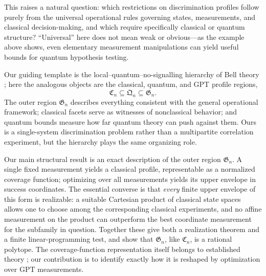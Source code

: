 \documentclass[a4paper,11pt,onecolumn,unpublished]{quantumarticle}
\theoremstyle{definition}
\newcommand{\1}{\mathbf 1}
\newcommand{\Creg}{\mathfrak C}
\newcommand{\Qreg}{\mathfrak Q}
\newcommand{\Greg}{\mathfrak G}
\begin{document}
This raises a natural question: which restrictions on discrimination profiles
follow purely from the universal operational rules governing states,
measurements, and classical decision-making, and which require specifically
classical or quantum structure? ``Universal'' here does not mean weak or
obvious---as the example above shows, even elementary measurement manipulations
can yield useful bounds for quantum hypothesis testing.

Our guiding template is the local--quantum--no-signalling hierarchy of Bell
theory \cite{BrunnerEtAl2014}; here the analogous objects are the classical,
quantum, and GPT profile regions,
\begin{equation}\label{eq:hierarchy}
 \Creg_n\subseteq\Qreg_n\subseteq\Greg_n.
\end{equation}
The outer region $\Greg_n$ describes everything consistent with the general
operational framework; classical facets serve as witnesses of nonclassical
behavior; and quantum bounds measure how far quantum theory can push against
them. Ours is a single-system discrimination problem rather than a multipartite
correlation experiment, but the hierarchy plays the same organizing role.

Our main structural result is an exact description of the outer region
$\Greg_n$. A single fixed measurement yields a classical profile,
representable as a normalized coverage function; optimizing over all
measurements yields its upper envelope in success coordinates. The essential
converse is that \emph{every} finite upper envelope of this form is realizable:
a suitable Cartesian product of classical state spaces allows one to choose
among the corresponding classical experiments, and no affine measurement on
the product can outperform the best coordinate measurement for the subfamily
in question. Together these give both a realization theorem and a finite
linear-programming test, and show that $\Greg_n$, like $\Creg_n$, is a rational
polytope. The coverage-function representation itself belongs to established
theory \cite{StrokorbSchlather2015}; our contribution is to identify exactly how
it is reshaped by optimization over GPT measurements.
\end{document}
